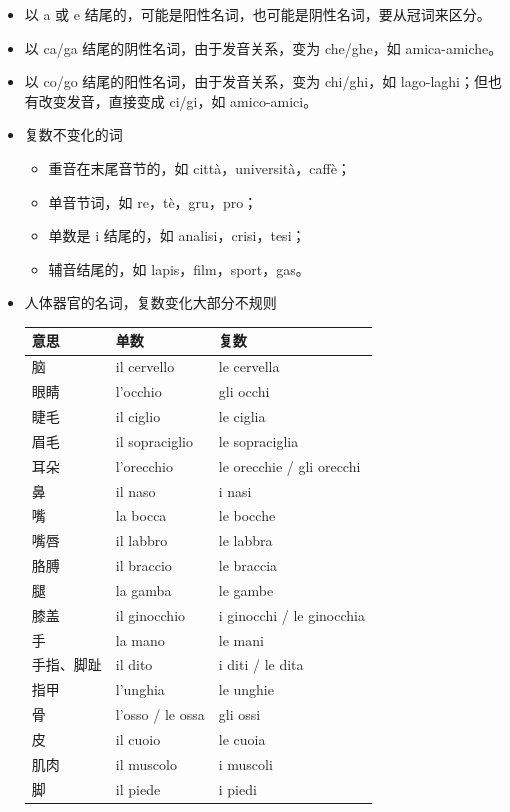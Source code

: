 \documentclass[UTF8,a4paper,titlepage,10pt]{report}
\begin{document}
\begin{enumerate}
\begin{itemize}
\item 以 a 或 e 结尾的，可能是阳性名词，也可能是阴性名词，要从冠词来区分。
\item 以 ca/ga 结尾的阴性名词，由于发音关系，变为 che/ghe，如 amica-amiche。
\item 以 co/go 结尾的阳性名词，由于发音关系，变为 chi/ghi，如 lago-laghi；但也有改变发音，直接变成 ci/gi，如 amico-amici。
\item 复数不变化的词
\begin{itemize}
\item 重音在末尾音节的，如 città，università，caffè；
\item 单音节词，如 re，tè，gru，pro；
\item 单数是 i 结尾的，如 analisi，crisi，tesi；
\item 辅音结尾的，如 lapis，film，sport，gas。
\end{itemize}
\item 人体器官的名词，复数变化大部分不规则
\begin{center}
\begin{tabular}{lll}
意思 & 单数 & 复数\\[0pt]
\hline
脑 & il cervello & le cervella\\[0pt]
眼睛 & l'occhio & gli occhi\\[0pt]
睫毛 & il ciglio & le ciglia\\[0pt]
眉毛 & il sopraciglio & le sopraciglia\\[0pt]
耳朵 & l'orecchio & le orecchie / gli orecchi\\[0pt]
鼻 & il naso & i nasi\\[0pt]
嘴 & la bocca & le bocche\\[0pt]
嘴唇 & il labbro & le labbra\\[0pt]
胳膊 & il braccio & le braccia\\[0pt]
腿 & la gamba & le gambe\\[0pt]
膝盖 & il ginocchio & i ginocchi / le ginocchia\\[0pt]
手 & la mano & le mani\\[0pt]
手指、脚趾 & il dito & i diti / le dita\\[0pt]
指甲 & l'unghia & le unghie\\[0pt]
骨 & l'osso / le ossa & gli ossi\\[0pt]
皮 & il cuoio & le cuoia\\[0pt]
肌肉 & il muscolo & i muscoli\\[0pt]
脚 & il piede & i piedi\\[0pt]
\end{tabular}
\end{center}
\end{itemize}
\end{enumerate}
\end{document}
